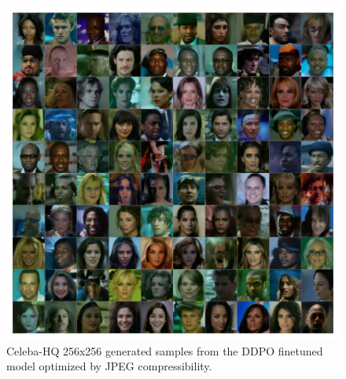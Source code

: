 \begin{appendixs}
        \begin{figure}
            \centering
            \includegraphics[scale=0.8]{img/results/ddpo-compressibility-samples.png}
            \vspace{-4pt}  %
            \captionsetup{width=\textwidth} %
            \caption{Celeba-HQ 256x256 generated samples from the DDPO finetuned model optimized by JPEG compressibility.}
            \label{fig:ddpo-compressibility-samples}
        \end{figure}


\end{appendixs}
